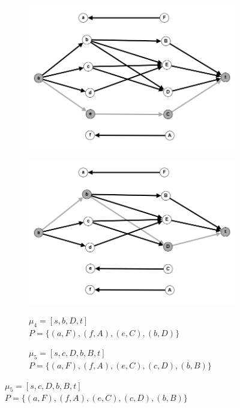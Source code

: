 \documentclass{article}
\begin{document}
\begin{enumerate}
\begin{figure}
\begin{subfigure}[t]{0.32\textwidth}
         \includegraphics[width=\textwidth]{attachments/10/3.png}
         \label{fig:10_3}
     \end{subfigure}
      \hfill
     \begin{subfigure}[t]{0.32\textwidth}
        \centering
         \caption*{\small{$\mu_4 = [s, b, D, t]$\\$P =\{(a,F),(f,A),(e, C), (b, D)\}$}}
         \includegraphics[width=\textwidth]{attachments/10/4.png}
         \label{fig:10_4}
     \end{subfigure}
    \hfill
     \begin{subfigure}[t]{0.32\textwidth}
        \centering
         \caption*{\small{$\mu_5 = [s, c, D, b, B, t]$\\$P =\{(a,F),(f,A),(e, C), (c,D), (b,B)\}$}}

\end{subfigure}
\end{figure}
\end{enumerate}
\end{document}

